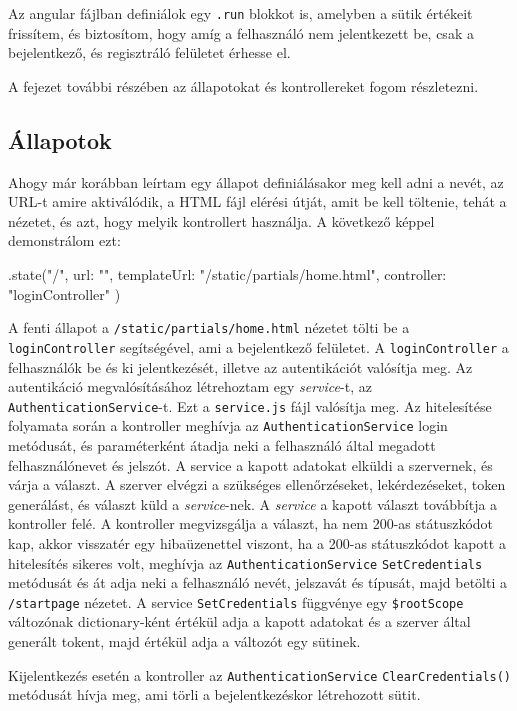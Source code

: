 Az angular fájlban definiálok egy \texttt{.run} blokkot is, amelyben a sütik értékeit frissítem, és biztosítom, hogy amíg a felhasználó nem jelentkezett be, csak a bejelentkező, és regisztráló felületet érhesse el.

A fejezet további részében az állapotokat és kontrollereket fogom részletezni.

\subsection{Állapotok}

Ahogy már korábban leírtam egy állapot definiálásakor meg kell adni a nevét, az URL-t amire aktiválódik, a HTML fájl elérési útját, amit be kell töltenie, tehát a nézetet, és azt, hogy melyik kontrollert használja. A következő képpel demonstrálom ezt:

\begin{cpp}
.state("/", {
    url: "",
    templateUrl: "/static/partials/home.html",
    controller: "loginController"
})
\end{cpp}

A fenti állapot a \texttt{/static/partials/home.html} nézetet tölti be a \texttt{loginController} segítségével, ami a bejelentkező felületet. A \texttt{loginController} a felhasználók be és ki jelentkezését, illetve az autentikációt valósítja meg. Az autentikáció megvalósításához létrehoztam egy \textit{service}-t, az \texttt{AuthenticationService}-t. Ezt a \texttt{service.js} fájl valósítja meg. Az hitelesítése folyamata során a kontroller meghívja az \texttt{AuthenticationService} login metódusát, és paraméterként átadja neki a felhasználó által megadott felhasználónevet és jelszót. A service a kapott adatokat elküldi a szervernek, és várja a választ. A szerver elvégzi a szükséges ellenőrzéseket, lekérdezéseket, token generálást, és választ küld a \textit{service}-nek. A \textit{service} a kapott választ továbbítja a kontroller felé. A kontroller megvizsgálja a választ, ha nem 200-as státuszkódot kap, akkor visszatér egy hibaüzenettel viszont, ha a 200-as státuszkódot kapott a hitelesítés sikeres volt, meghívja az \texttt{AuthenticationService} \texttt{SetCredentials} metódusát és át adja neki a felhasználó nevét, jelszavát és típusát, majd betölti a \texttt{/startpage} nézetet. A service \texttt{SetCredentials} függvénye egy \texttt{\$rootScope} változónak dictionary-ként értékül adja a kapott adatokat és a szerver által generált tokent, majd értékül adja a változót egy sütinek.

Kijelentkezés esetén a kontroller az \texttt{AuthenticationService} \texttt{ClearCredentials()} metódusát hívja meg, ami törli a bejelentkezéskor létrehozott sütit.

